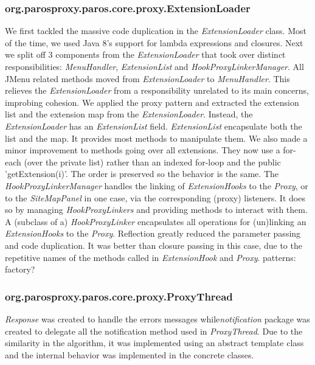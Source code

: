 \subsubsection{org.parosproxy.paros.core.proxy.ExtensionLoader}
We first tackled the massive code duplication in  the \textit{ExtensionLoader} class. Most of the time, we used Java 8's support for lambda expressions and closures. Next we split off 3 components from the \textit{ExtensionLoader} that took over distinct responsibilities: \textit{MenuHandler}, \textit{ExtensionList} and \textit{HookProxyLinkerManager}.
All JMenu related methods moved from \textit{ExtensionLoader} to \textit{MenuHandler}. This relieves the \textit{ExtensionLoader} from a responsibility unrelated to its main concerns, improbing cohesion.
We applied the proxy pattern and extracted the extension list and the extension map from the \textit{ExtensionLoader}. Instead, the \textit{ExtensionLoader} has an \textit{ExtensionList} field. \textit{ExtensionList} encapsulate both the list and the map. It provides most methods to manipulate them.
We also made a minor improvement to methods going over all extensions. They now use a for-each (over the private list) rather than an indexed for-loop and the public 'getExtension(i)'. The order is preserved so the behavior is the same.
The \textit{HookProxyLinkerManager} handles the linking of \textit{ExtensionHooks} to the \textit{Proxy}, or to the \textit{SiteMapPanel} in one case, via the corresponding (proxy) listeners. It does so by managing \textit{HookProxyLinkers} and providing methods to interact with them.
A (subclass of a) \textit{HookProxyLinker} encapsulates all operations for (un)linking an \textit{ExtensionHooks} to the \textit{Proxy}. Reflection greatly reduced the parameter passing and code duplication. It was better than closure passing in this case, due to the repetitive names of the methods called in \textit{ExtensionHook} and \textit{Proxy}.
patterns: factory?
\subsubsection{org.parosproxy.paros.core.proxy.ProxyThread}

\textit{Response} was created to handle the errors messages while\textit{notification} package was created to delegate all the notification method used in \textit{ProxyThread}. Due to the similarity in the algorithm, it was implemented using an abstract template class and the internal behavior was implemented in the concrete classes.
